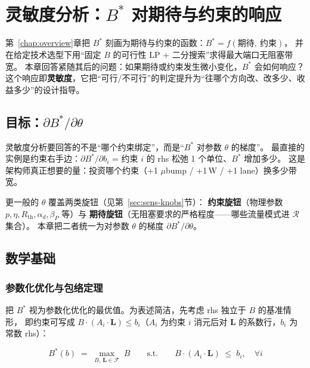 \chapter{灵敏度分析：$B^*$ 对期待与约束的响应}\label{chap:sensitivity}

第~\ref{chap:overview}章把 $B^*$ 刻画为期待与约束的函数：$B^* = f(\text{期待},\ \text{约束})$，
并在给定技术选型下用``固定 $B$ 的可行性 LP + 二分搜索''求得最大端口无阻塞带宽。
本章回答紧随其后的问题：如果期待或约束发生微小变化，$B^*$ 会如何响应？
这个响应即\textbf{灵敏度}，它把``可行/不可行''的判定提升为``往哪个方向改、改多少、收益多少''的设计指导。

\section{目标：$\partial B^*/\partial\theta$}\label{sec:sens-objective}

灵敏度分析要回答的不是``哪个约束绑定''，而是``$B^*$ 对参数 $\theta$ 的梯度''。
最直接的实例是约束右手边：$\partial B^*/\partial b_i$ = 约束 $i$ 的 rhs 松弛 1 个单位、$B^*$ 增加多少。
这是架构师真正想要的量：投资哪个约束（+1 $\mu$bump / +1\,W / +1 lane）换多少带宽。

更一般的 $\theta$ 覆盖两类旋钮（见第~\ref{sec:sens-knobs}节）：
\textbf{约束旋钮}（物理参数 $p,\eta,R_{\text{th}},\alpha_d,\beta_P$ 等）与
\textbf{期待旋钮}（无阻塞要求的严格程度——哪些流量模式进 $\mathcal{R}$ 集合）。
本章把二者统一为对参数 $\theta$ 的梯度 $\partial B^*/\partial\theta$。

\section{数学基础}\label{sec:sens-math}

\subsection{参数化优化与包络定理}\label{sec:sens-envelope}

把 $B^*$ 视为参数化优化的最优值。为表述简洁，先考虑 rhs 独立于 $B$ 的基准情形，
即约束可写成 $B\cdot(A_i\cdot\mathbf{L})\le b_i$（$A_i$ 为约束 $i$ 消元后对 $\mathbf{L}$ 的系数行，$b_i$ 为常数 rhs）：

\begin{equation}\label{eq:sens-param}
    B^*(b) \;=\; \max_{B,\ \mathbf{L}\in\mathcal{F}}\; B
    \qquad\text{s.t.}\qquad
    B \cdot (A_i \cdot \mathbf{L}) \;\le\; b_i,\quad \forall i
\end{equation}

